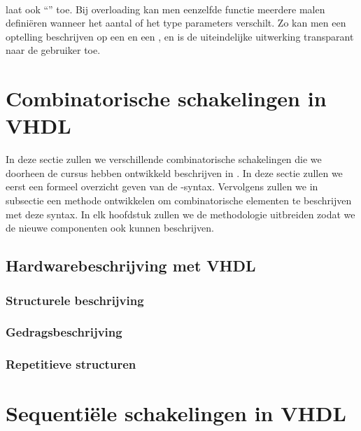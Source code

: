 \paragraph{}
\tvhdl{} laat ook ``'' toe. Bij overloading kan men eenzelfde functie meerdere malen defini\"eren wanneer het aantal of het type parameters verschilt. Zo kan men een optelling beschrijven op een  en een , en is de uiteindelijke uitwerking transparant naar de gebruiker toe.

\section{Combinatorische schakelingen in VHDL}

In deze sectie zullen we verschillende combinatorische schakelingen die we doorheen de cursus hebben ontwikkeld beschrijven in \tvhdl{}. In deze sectie zullen we eerst een formeel overzicht geven van de \tvhdl{}-syntax. Vervolgens zullen we in subsectie  een methode ontwikkelen om combinatorische elementen te beschrijven met deze syntax. In elk hoofdstuk zullen we de methodologie uitbreiden zodat we de nieuwe componenten ook kunnen beschrijven.

\subsection{Hardwarebeschrijving met VHDL}

\subsubsection{Structurele beschrijving}

\subsubsection{Gedragsbeschrijving}

\subsubsection{Repetitieve structuren}

\section{Sequenti\"ele schakelingen in VHDL}

